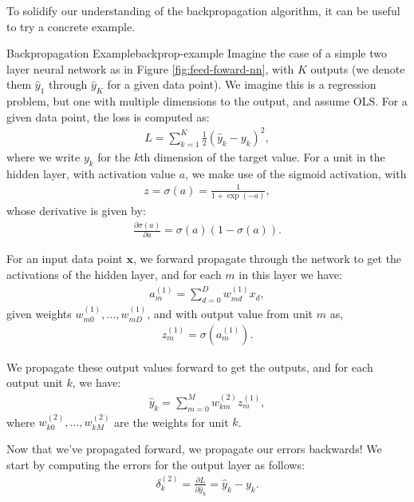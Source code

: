 To solidify our understanding of the backpropagation algorithm, it can be useful to try a concrete example.
%
\begin{example}{Backpropagation Example}{backprop-example}
  Imagine the case of a simple two layer neural network as in Figure \ref{fig:feed-foward-nn}, with $K$ outputs (we denote them $\hat{y}_1$ through $\hat{y}_K$ for a given data point). We imagine this is a regression problem, but one
  with multiple dimensions to the output, and assume OLS. For a given data point, the loss is computed as:
	\begin{align*}
		L = \sum_{k=1}^{K} \frac{1}{2}(\hat{y}_{k} - y_{k})^{2},
	\end{align*}
        where we write $y_k$ for the $k$th dimension of the target value.
%
        For a unit in the hidden layer, with activation value $a$, we make use of the sigmoid activation, with 
	\begin{align*}
z=		\sigma(a) = \frac{1}{1 + \exp{(-a)}},
	\end{align*}
	whose derivative is given by:
	\begin{align*}
		\frac{\partial \sigma(a)}{\partial a} = \sigma(a)(1 - \sigma(a)).
	\end{align*}
        
	For an input data point $\textbf{x}$, we forward propagate through the network to get the activations of the hidden layer, and for each $m$ in this layer we have:
	\begin{align*}
		a_{m}^{(1)} = \sum_{d=0}^{D} w^{(1)}_{md} x_{d},
	\end{align*}
    given weights $w^{(1)}_{m0},\ldots, w^{(1)}_{mD}$,   and  with output value from unit $m$ as, 
%
	\begin{align*}
		z^{(1)}_{m} = \sigma{(a^{(1)}_{m})}.
	\end{align*}
        
	We propagate these output values  forward to get the outputs, and for each output unit $k$, we have:
	\begin{align*}
		\hat{y}_{k} = \sum_{m=0}^{M} w_{km}^{(2)} z^{(1)}_{m},
	\end{align*}
where $w^{(2)}_{k0},\ldots,w^{(2)}_{kM}$ are the weights for unit $k$.
        
	Now that we've propagated forward, we propagate our errors backwards! We start by computing the errors for the output layer as follows:
	\begin{align*}
		\delta^{(2)}_{k} =  \frac{\partial L}{\partial \hat{y}_k}=\hat{y}_{k} - y_{k}.
	\end{align*}


\end{example}
